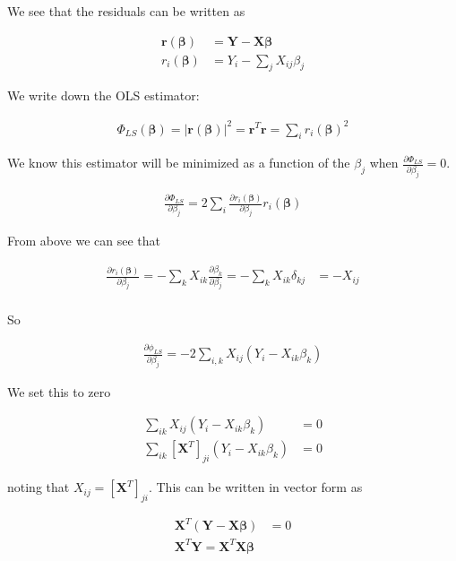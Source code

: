 \documentclass[12pt]{article}
\newcommand{\bv}[1]{\boldsymbol{#1}}
\begin{document}
We see that the residuals can be written as

\begin{align}
\bv{r}(\bv{\beta}) &= \bv{Y} - \bv{X}\bv{\beta}\\
r_i(\bv{\beta}) &= Y_i - \sum_j X_{ij}\beta_j
\end{align}

We write down the OLS estimator:

\begin{align}
\Phi_{LS}(\bv{\beta}) = |\bv{r}(\bv{\beta})|^2 = \bv{r}^T\bv{r} = \sum_i r_i(\bv{\beta})^2
\end{align}

We know this estimator will be minimized as a function of the $\beta_j$ when $\frac{\partial \Phi_{LS}}{\partial \beta_j} = 0$.

\begin{align}
\frac{\partial \Phi_{LS}}{\partial \beta_j} = 2\sum_i \frac{\partial r_i(\bv{\beta})}{\partial \beta_j} r_i(\bv{\beta})
\end{align}

From above we can see that

\begin{align}
\frac{\partial r_i(\bv{\beta})}{\partial \beta_j} = -\sum_k X_{ik} \frac{\partial \beta_k}{\partial \beta_j} = -\sum_k X_{ik} \delta_{kj} &= -X_{ij}\\
\end{align}

So

\begin{align}
\frac{\partial \phi_{LS}}{\partial \beta_j} = -2\sum_{i,k} X_{ij}\left(Y_i - X_{ik}\beta_k\right)
\end{align}

We set this to zero

\begin{align}
\sum_{ik} X_{ij}\left(Y_i - X_{ik}\beta_k\right) &= 0\\
\sum_{ik} \left[\bv{X}^T\right]_{ji} \left(Y_i - X_{ik}\beta_k\right)&=0
\end{align}

noting that $X_{ij} = \left[\bv{X}^T\right]_{ji}$. This can be written in vector form as

\begin{align}
\bv{X}^T \left(\bv{Y} - \bv{X}\bv{\beta}\right) &= 0\\
\bv{X}^T\bv{Y} = \bv{X}^T\bv{X}\bv{\beta}
\end{align}
\end{document}
